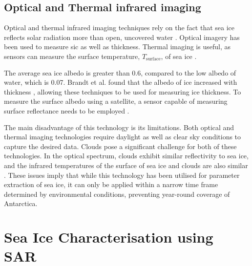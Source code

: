 \subsection{Optical and Thermal infrared imaging} \label{subsec:litReview.seaIceCharac.opticalThermal}

Optical and thermal infrared imaging techniques rely on the fact that sea ice reflects solar radiation more than open, uncovered water \cite{Thomas2017Chap9}. Optical imagery has been used to measure \acs{sic} \cite{Emery1994} as well as thickness. Thermal imaging is useful, as sensors can measure the surface temperature, $T_{\text{surface}}$, of sea ice \cite{Thomas2017Chap9}.

The average sea ice albedo is greater than 0.6, compared to the low albedo of water, which is 0.07. Brandt et al. \cite{Brandt2005} found that the albedo of ice increased with thickness \cite{Thomas2017Chap9}, allowing these techniques to be used for measuring ice thickness. To measure the surface albedo using a satellite, a sensor capable of measuring surface reflectance needs to be employed \cite{Thomas2017Chap9}.

The main disadvantage of this technology is its limitations. Both optical and thermal imaging technologies require daylight as well as clear sky conditions to capture the desired data. Clouds pose a significant challenge for both of these technologies. In the optical spectrum, clouds exhibit similar reflectivity to sea ice, and the infrared temperatures of the surface of sea ice and clouds are also similar \cite{Thomas2017Chap9}. These issues imply that while this technology has been utilised for parameter extraction of sea ice, it can only be applied within a narrow time frame determined by environmental conditions, preventing year-round coverage of Antarctica.

\section{Sea Ice Characterisation using SAR} 
\label{sec:litReview.sarCharac}

